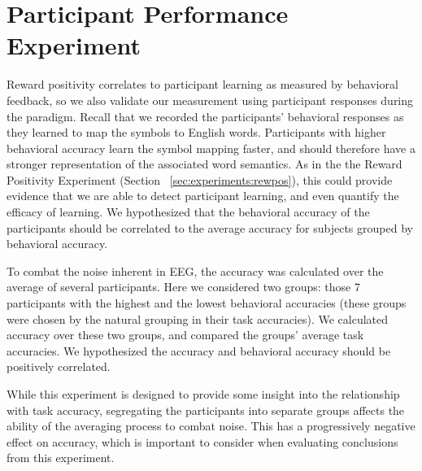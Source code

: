 \section{Participant Performance Experiment}
Reward positivity correlates to participant learning as measured by behavioral 
feedback, so we also validate our measurement using participant responses 
during the paradigm. Recall that we recorded the participants' behavioral 
responses as they learned to map the symbols to English words. Participants 
with higher behavioral accuracy learn the symbol mapping faster, and should 
therefore have a stronger representation of the associated word semantics. As 
in the the Reward Positivity Experiment (Section 
~\ref{sec:experiments:rewpos}), this could provide evidence that we are able to 
detect participant learning, and even quantify the efficacy of learning. We 
hypothesized that the behavioral accuracy of the participants should be 
correlated to the average \tvt accuracy for subjects grouped by behavioral 
accuracy.

To combat the noise inherent in EEG, the \tvt accuracy was calculated over the 
average of several participants. Here we considered two groups: those 7 
participants with the highest and the lowest behavioral accuracies (these 
groups were chosen by the natural grouping in their task accuracies). We 
calculated \tvt accuracy over these two groups, and compared the groups' 
average task accuracies. We hypothesized the \tvt accuracy and behavioral 
accuracy should be positively correlated.

While this experiment is designed to provide some insight into the relationship 
with task accuracy, segregating the participants into separate groups affects 
the ability of the averaging process to combat noise. This has a progressively 
negative effect on \tvt accuracy, which is important to consider when 
evaluating conclusions from this experiment.
